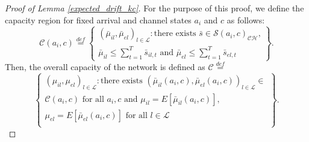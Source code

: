 \documentclass[conference]{IEEEtran}
\begin{document}
\begin{proof}[Proof of Lemma \ref{expected_drift_kc}]
For the purpose of this proof, we define the capacity region for fixed arrival and channel states $a_i$ and $c$ as follows:
\begin{equation*}
	\mathcal{C}(a_i,c) \stackrel{def}{=}
	\left\{
	\begin{array}{l}
		( \bar{\mu}_{il}, \bar{\mu}_{el} )_{l \in \mathcal{L}}: \mbox{there exists } \bar{s} \in \mathcal{S}(a_i,c)_\mathcal{CH} \mbox{,} \\
		\bar{\mu}_{il}\leq\sum_{t=1}^{T} \bar{s}_{il,t} \mbox{ and } \bar{\mu}_{el}\leq\sum_{t=1}^{T} \bar{s}_{el,t}
	\end{array}
	\right\}.
\end{equation*}
Then, the overall capacity of the network is defined as
$\mathcal{C} \stackrel{def}{=}$
\begin{equation*}
	\left\{
	\begin{array}{l}
		( \mu_{il}, \mu_{el} )_{l \in \mathcal{L}} : \mbox{there exists } ( \bar{\mu}_{il}(a_i,c), \bar{\mu}_{el}(a_i,c) )_{l \in \mathcal{L}} \in \\
		\mathcal{C}(a_i,c) \mbox{ for all } a_i, c \mbox{ and } \mu_{il} = E[ \bar{\mu}_{il}(a_i,c) ] \mbox{, } \\
		\mu_{el} = E[ \bar{\mu}_{el}(a_i,c) ] \mbox{ for all } l \in \mathcal{L} \\
	\end{array}
	\right\}.
\end{equation*}


\end{proof}
\end{document}
